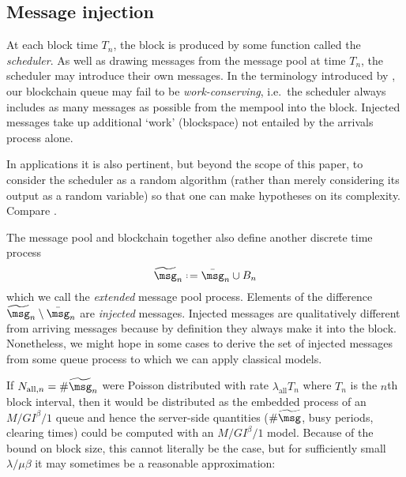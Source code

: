 \documentclass[a4paper,11pt]{article}
\begin{document}
\subsection{Message injection}
\label{message-injection}


At each block time $T_n$, the block is produced by some function called the \emph{scheduler}.
%
As well as drawing messages from the message pool at time $T_n$, the scheduler may introduce their own messages.
%
In the terminology introduced by \cite{wolff1970work}, our blockchain queue may fail to be \emph{work-conserving}, i.e.~the scheduler always includes as many messages as possible from the mempool into the block. Injected messages take up additional `work' (blockspace) not entailed by the arrivals process alone.

\begin{remark}

  In applications it is also pertinent, but beyond the scope of this paper, to consider the scheduler as a random algorithm (rather than merely considering its output as a random variable) so that one can make hypotheses on its complexity. Compare \cite[\S3]{ferreira2022credible}.
  
\end{remark}

The message pool and blockchain together also define another discrete time process
\begin{equation}
  \widetilde{\msg}_n \defeq \bar{\msg}_n \cup B_n
\end{equation}
which we call the \emph{extended} message pool process.
%
Elements of the difference $\widetilde\msg_n\setminus\bar\msg_n$ are \emph{injected} messages.
%
Injected messages are qualitatively different from arriving messages because by definition they always make it into the block.
%
Nonetheless, we might hope in some cases to derive the set of injected messages from some queue process to which we can apply classical models.

If $N_{\mathrm{all},n}=\#\widetilde\msg_n$ were Poisson distributed with rate $\lambda_\mathrm{all}T_n$ where $T_n$ is the $n$th block interval, then it would be distributed as the embedded process of an $M/GI^\beta/1$ queue and hence the server-side quantities ($\#\widetilde\msg$, busy periods, clearing times) could be computed with an $M/GI^\beta/1$ model.
%
Because of the bound on block size, this cannot literally be the case, but for sufficiently small $\lambda/\mu\beta$ it may sometimes be a reasonable approximation:
\end{document}
